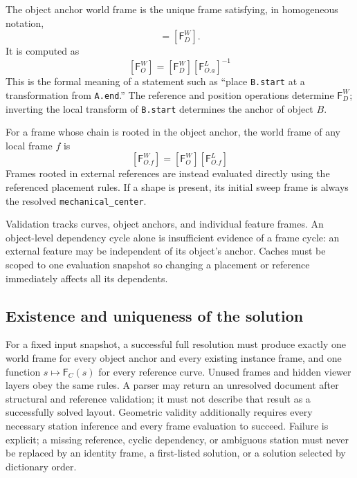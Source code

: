 \documentclass[11pt,a4paper]{article}
\newcommand{\Frame}{\mathsf{F}}
\begin{document}
The object anchor world frame is the unique frame satisfying, in homogeneous
notation,
\begin{equation}
  [\Frame_O^W][\Frame_{O.a}^{L}]=[\Frame_D^W].
  \label{eq:target-constraint}
\end{equation}
It is computed as
\begin{equation}
  \boxed{[\Frame_O^W]=[\Frame_D^W][\Frame_{O.a}^{L}]^{-1}}
  \label{eq:object-frame}
\end{equation}
This is the formal meaning of a statement such as ``place \texttt{B.start} at
a transformation from \texttt{A.end}.''  The reference and position operations
determine $\Frame_D^W$; inverting the local transform of \texttt{B.start}
determines the anchor of object $B$.

For a frame whose chain is rooted in the object anchor, the world frame of any local frame $f$ is
\begin{equation}
  \boxed{[\Frame_{O.f}^W]=[\Frame_O^W][\Frame_{O.f}^{L}]}
  \label{eq:frame-world-frame}
\end{equation}
Frames rooted in external references are instead evaluated directly using
the referenced placement rules. If a shape is present, its initial sweep
frame is always the resolved \texttt{mechanical\_center}.

Validation tracks curves, object anchors, and individual feature frames.
An object-level dependency cycle alone is insufficient evidence of a frame
cycle: an external feature may be independent of its object's anchor.
Caches must be scoped to one evaluation snapshot so changing a placement or
reference immediately affects all its dependents.

\subsection{Existence and uniqueness of the solution}
\label{sec:uniqueness}

For a fixed input snapshot, a successful full resolution must produce exactly
one world frame for every object anchor and every existing instance frame,
and one function $s\mapsto\Frame_C(s)$ for every reference curve. Unused
frames and hidden viewer layers obey the same rules. A parser may return an
unresolved document after structural and reference validation; it must not
describe that result as a successfully solved layout. Geometric validity
additionally requires every necessary station inference and every frame
evaluation to succeed. Failure is explicit; a missing reference, cyclic
dependency, or ambiguous station must never be replaced by an identity frame,
a first-listed solution, or a solution selected by dictionary order.
\end{document}
